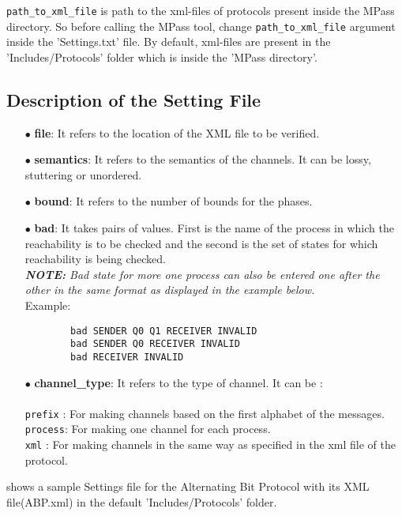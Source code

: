 {\tt path\_to\_xml\_file} is path to the xml-files of protocols present inside the MPass directory. So before calling the MPass tool, change {\tt path\_to\_xml\_file} argument inside the 'Settings.txt' file. By default, xml-files are present in the 'Includes/Protocols' folder which is inside the 'MPass directory'.


\subsection{Description of the Setting File}
\begin{itemize}
\item[$\bullet$] {\bf file}: It refers to the location of the XML file to be verified.

\item[$\bullet$] {\bf semantics}: It refers to the semantics of the channels. It can be lossy, stuttering or unordered.

\item[$\bullet$] {\bf bound}: It refers to the number of bounds for the phases.

\item[$\bullet$] {\bf bad}: It takes pairs of values. First is the name of the process in which the reachability is to be checked and the second is the  set of states for which reachability is being checked.\\
\emph{{\bf NOTE: }Bad state for more one process can also be entered one after the other in the same format as displayed in the example below.}\\

Example:
\begin{verbatim}
        bad SENDER Q0 Q1 RECEIVER INVALID
        bad SENDER Q0 RECEIVER INVALID
        bad RECEIVER INVALID
\end{verbatim}

\item[$\bullet$] {\bf channel\_type}: It refers to the type of channel. It can be :\\\\
{\tt prefix} : For making channels based on the first alphabet of the messages.\\
{\tt process}: For making one channel for each process.\\
{\tt xml} : For making channels in the same way as specified in the xml file of the protocol.
\end{itemize}
\pagebreak
{} shows a sample Settings file for the Alternating Bit Protocol with its XML file(ABP.xml) in the default 'Includes/Protocols' folder.
